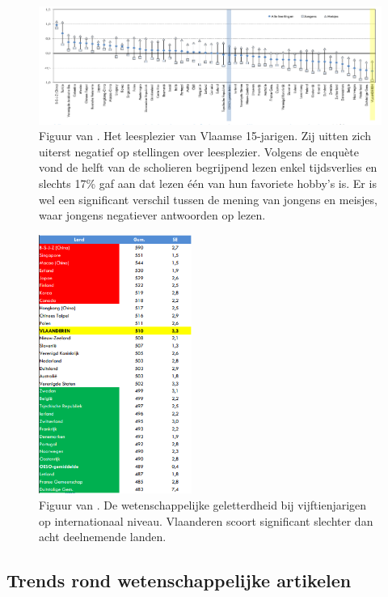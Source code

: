 \begin{figure}[H]
	\begin{center}
		\includegraphics[width=\linewidth]{img/oeso-graphic-leesplezier.png}
	\end{center}
	\caption{Figuur van \textcite{DeMeyer2019}. Het leesplezier van Vlaamse 15-jarigen. Zij uitten zich uiterst negatief op stellingen over leesplezier. Volgens de enquète vond de helft van de scholieren begrijpend lezen enkel tijdsverlies en slechts 17\% gaf aan dat lezen één van hun favoriete hobby's is. Er is wel een significant verschil tussen de mening van jongens en meisjes, waar jongens negatiever antwoorden op lezen.}
\end{figure}

\begin{figure}[H]
	\begin{center}
		\includegraphics[width=5cm]{img/oeso-graphic-wetenschappelijke-geletterdheid-2.png}
	\end{center}
	\caption{Figuur van \textcite{DeMeyer2019}. De wetenschappelijke geletterdheid bij vijftienjarigen op internationaal niveau. Vlaanderen scoort significant slechter dan acht deelnemende landen.}
\end{figure}


\subsection{Trends rond wetenschappelijke artikelen}

